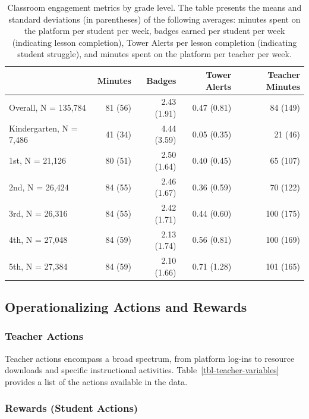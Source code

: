 \documentclass[
  number,
  preprint,
  3p,
  onecolumn]{elsarticle}
\begin{document}
\begin{longtable}{l|rrrr}

\caption{\label{tbl-classroom-summary}Classroom engagement metrics by
grade level. The table presents the means and standard deviations (in
parentheses) of the following averages: minutes spent on the platform
per student per week, badges earned per student per week (indicating
lesson completion), Tower Alerts per lesson completion (indicating
student struggle), and minutes spent on the platform per teacher per
week.}

\tabularnewline

\toprule
\multicolumn{1}{l}{} & Minutes & Badges & Tower Alerts & Teacher Minutes \\ 
\midrule\addlinespace[2.5pt]
Overall, N = 135,784 & 81 (56) & 2.43 (1.91) & 0.47 (0.81) & 84 (149) \\ 
Kindergarten, N = 7,486 & 41 (34) & 4.44 (3.59) & 0.05 (0.35) & 21 (46) \\ 
1st, N = 21,126 & 80 (51) & 2.50 (1.64) & 0.40 (0.45) & 65 (107) \\ 
2nd, N = 26,424 & 84 (55) & 2.46 (1.67) & 0.36 (0.59) & 70 (122) \\ 
3rd, N = 26,316 & 84 (55) & 2.42 (1.71) & 0.44 (0.60) & 100 (175) \\ 
4th, N = 27,048 & 84 (59) & 2.13 (1.74) & 0.56 (0.81) & 100 (169) \\ 
5th, N = 27,384 & 84 (59) & 2.10 (1.66) & 0.71 (1.28) & 101 (165) \\ 
\bottomrule

\end{longtable}

\subsection{Operationalizing Actions and
Rewards}\label{operationalizing-actions-and-rewards}

\subsubsection{Teacher Actions}\label{teacher-actions}

Teacher actions encompass a broad spectrum, from platform log-ins to
resource downloads and specific instructional activities.
Table~\ref{tbl-teacher-variables} provides a list of the actions
available in the data.

\subsubsection{Rewards (Student Actions)}\label{rewards-student-actions}
\end{document}
